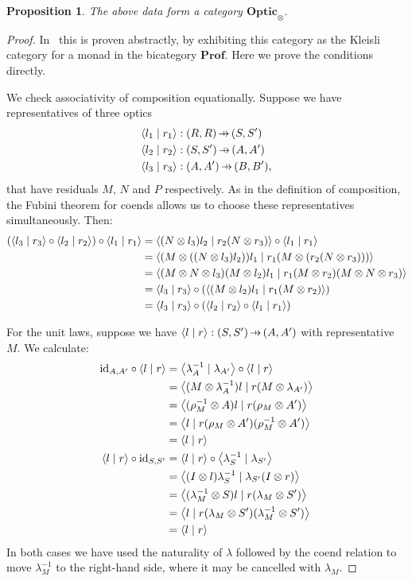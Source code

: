 \documentclass[11pt,letterpaper]{article}
\theoremstyle{plain}
\newtheorem{proposition}[theorem]{Proposition}
\theoremstyle{definition}
\newcommand{\Prof}{\mathbf{Prof}}
\newcommand{\Optic}{\mathbf{Optic}}
\newcommand{\id}{\mathrm{id}}
\newcommand{\rep}[2]{{\ensuremath \left\langle #1 \mid #2 \right\rangle}}
\newcommand{\hto}{\ensuremath{\,\mathaccent\shortmid\rightarrow\,}}
\begin{document}
\begin{proposition}\label{prop:optic-is-cat}
  The above data form a category $\Optic_\otimes$.
\end{proposition}
\begin{proof}
  In~\cite[Section 6]{Doubles} this is proven abstractly, by exhibiting this category as the Kleisli category for a monad in the bicategory $\Prof$. Here we prove the conditions directly.

  We check associativity of composition equationally.  Suppose we have representatives of three optics 
\begin{align*}
  \rep{l_1}{r_1} &: (R, R) \hto (S, S') \\
  \rep{l_2}{r_2} &: (S, S') \hto (A, A') \\
  \rep{l_3}{r_3} &: (A, A') \hto (B, B'),
\end{align*}
that have residuals $M$, $N$ and $P$ respectively. As in the definition of composition, the Fubini theorem for coends allows us to choose these representatives simultaneously. Then:
  \begin{align*}
    (\rep{l_3}{r_3} \circ \rep{l_2}{r_2}) \circ \rep{l_1}{r_1}
    &= \rep{(N \otimes l_3)l_2}{r_2(N \otimes r_3)} \circ \rep{l_1}{r_1} \\
    &= \rep{(M \otimes ((N \otimes l_3)l_2))l_1}{r_1(M \otimes (r_2(N \otimes r_3)))} \\
    &= \rep{(M \otimes N \otimes l_3)(M \otimes l_2)l_1}{r_1(M \otimes r_2)(M \otimes N \otimes r_3)} \\
    &= \rep{l_3}{r_3} \circ (\rep{(M \otimes l_2)l_1}{r_1(M \otimes r_2)}) \\
    &= \rep{l_3}{r_3} \circ (\rep{l_2}{r_2} \circ \rep{l_1}{r_1})
  \end{align*}

  For the unit laws, suppose we have $\rep{l}{r} : (S, S') \hto (A, A')$ with representative $M$. We calculate:
  \begin{align*}
    \id_{A, A'} \circ \rep{l}{r}
    &= \rep{\lambda^{-1}_A}{\lambda_{A'}} \circ \rep{l}{r} \\
    &= \rep{(M \otimes \lambda^{-1}_A) l}{r (M \otimes  \lambda_{A'})} \\
    &= \rep{(\rho^{-1}_M \otimes  A) l}{r (\rho_M \otimes A')} \\
    &= \rep{l}{r (\rho_M \otimes A') (\rho^{-1}_M \otimes A')} \\
    &= \rep{l}{r} \\
    \rep{l}{r} \circ \id_{S, S'}
    &= \rep{l}{r} \circ \rep{\lambda^{-1}_S}{\lambda_{S'}}  \\
    &= \rep{(I \otimes l)\lambda^{-1}_S}{\lambda_{S'} (I \otimes r)} \\
    &= \rep{(\lambda^{-1}_M \otimes S)l}{r (\lambda_{M} \otimes S')} \\
    &= \rep{l}{r (\lambda_{M} \otimes S')(\lambda^{-1}_M \otimes S')} \\
    &= \rep{l}{r}
  \end{align*}
  In both cases we have used the naturality of $\lambda$ followed by the coend relation to move $\lambda^{-1}_M$ to the right-hand side, where it may be cancelled with $\lambda_M$.
\end{proof}
\end{document}
